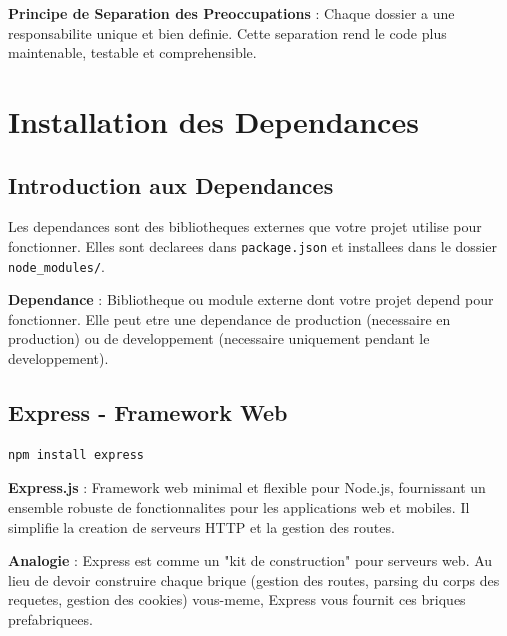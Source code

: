 \documentclass[a4paper,12pt]{book}
\begin{document}
\begin{bestpracticebox}
    \textbf{Principe de Separation des Preoccupations} :
    Chaque dossier a une responsabilite unique et bien definie. Cette separation rend le code plus maintenable, testable et comprehensible.
\end{bestpracticebox}

\chapter{Installation des Dependances}

\section{Introduction aux Dependances}

Les dependances sont des bibliotheques externes que votre projet utilise pour fonctionner. Elles sont declarees dans \texttt{package.json} et installees dans le dossier \texttt{node\_modules/}.

\begin{definitionbox}
    \textbf{Dependance} : Bibliotheque ou module externe dont votre projet depend pour fonctionner. Elle peut etre une dependance de production (necessaire en production) ou de developpement (necessaire uniquement pendant le developpement).
\end{definitionbox}

\section{Express - Framework Web}

\begin{lstlisting}[style=bash, caption=Installation d'Express]
npm install express
\end{lstlisting}

\begin{definitionbox}
    \textbf{Express.js} : Framework web minimal et flexible pour Node.js, fournissant un ensemble robuste de fonctionnalites pour les applications web et mobiles. Il simplifie la creation de serveurs HTTP et la gestion des routes.
\end{definitionbox}

\begin{analogybox}
    \textbf{Analogie} : Express est comme un "kit de construction" pour serveurs web. Au lieu de devoir construire chaque brique (gestion des routes, parsing du corps des requetes, gestion des cookies) vous-meme, Express vous fournit ces briques prefabriquees.
\end{analogybox}
\end{document}
